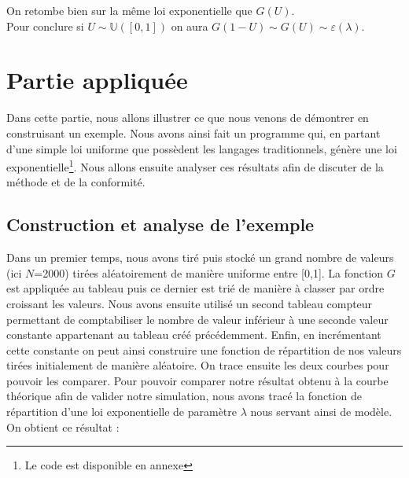 \documentclass[12,french]{report}
\begin{document}
On retombe bien sur la même loi exponentielle que $G(U)$. \\

Pour conclure si $U\sim\mathbb{U}([0,1])$ on aura $G(1-U) \sim G(U)\sim \varepsilon(\lambda)$.

\chapter{Partie appliquée}

Dans cette partie, nous allons illustrer ce que nous venons de démontrer en construisant un exemple. Nous avons ainsi fait un programme qui, en partant d'une simple loi uniforme que possèdent les langages traditionnels, génère une loi exponentielle\footnote{Le code est disponible en annexe}. Nous allons ensuite analyser ces résultats afin de discuter de la méthode et de la conformité.\\

\section{Construction et analyse de l'exemple}

Dans un premier temps, nous avons tiré puis stocké un grand nombre de valeurs (ici $N$=2000) tirées aléatoirement de manière uniforme entre [0,1]. La fonction $G$ est appliquée au tableau puis ce dernier est trié de manière à classer par ordre croissant les valeurs. Nous avons ensuite utilisé un second tableau compteur permettant de comptabiliser  le nombre de valeur inférieur à une seconde valeur constante appartenant au tableau créé précédemment. Enfin, en incrémentant cette constante on peut ainsi construire une fonction de répartition de nos valeurs tirées initialement de manière aléatoire. On trace ensuite les deux courbes pour pouvoir les comparer. Pour pouvoir comparer notre résultat obtenu à la courbe théorique afin de valider notre simulation, nous avons tracé la fonction de répartition d'une loi exponentielle de paramètre $\lambda$ nous servant ainsi de modèle.\\

On obtient ce résultat :
\end{document}
